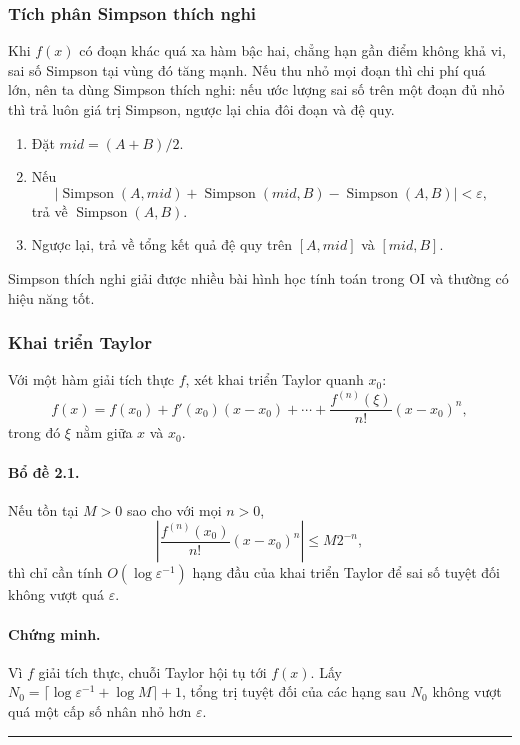 \documentclass[11pt]{article}
\begin{document}
\subsubsection{Tích phân Simpson thích nghi}

Khi $f(x)$ có đoạn khác quá xa hàm bậc hai, chẳng hạn gần điểm không khả vi,
sai số Simpson tại vùng đó tăng mạnh. Nếu thu nhỏ mọi đoạn thì chi phí quá lớn,
nên ta dùng Simpson thích nghi: nếu ước lượng sai số trên một đoạn đủ nhỏ thì
trả luôn giá trị Simpson, ngược lại chia đôi đoạn và đệ quy.

\begin{enumerate}
  \item Đặt $\mathit{mid}=(A+B)/2$.
  \item Nếu
  \[
    |\operatorname{Simpson}(A,\mathit{mid})
    +\operatorname{Simpson}(\mathit{mid},B)
    -\operatorname{Simpson}(A,B)|<\varepsilon,
  \]
  trả về $\operatorname{Simpson}(A,B)$.
  \item Ngược lại, trả về tổng kết quả đệ quy trên
  $[A,\mathit{mid}]$ và $[\mathit{mid},B]$.
\end{enumerate}

Simpson thích nghi giải được nhiều bài hình học tính toán trong OI và thường có
hiệu năng tốt.

\subsubsection{Khai triển Taylor}

Với một hàm giải tích thực $f$, xét khai triển Taylor quanh $x_0$:
\[
  f(x)=f(x_0)+f'(x_0)(x-x_0)+\cdots+
  \frac{f^{(n)}(\xi)}{n!}(x-x_0)^n,
\]
trong đó $\xi$ nằm giữa $x$ và $x_0$.

\paragraph{Bổ đề 2.1.}
Nếu tồn tại $M>0$ sao cho với mọi $n>0$,
\[
  \left|\frac{f^{(n)}(x_0)}{n!}(x-x_0)^n\right|\le M2^{-n},
\]
thì chỉ cần tính $O(\log\varepsilon^{-1})$ hạng đầu của khai triển Taylor để
sai số tuyệt đối không vượt quá $\varepsilon$.

\paragraph{Chứng minh.}
Vì $f$ giải tích thực, chuỗi Taylor hội tụ tới $f(x)$. Lấy
$N_0=\lceil\log\varepsilon^{-1}+\log M\rceil+1$, tổng trị tuyệt đối của các
hạng sau $N_0$ không vượt quá một cấp số nhân nhỏ hơn $\varepsilon$.
\hfill\rule{0.55em}{0.55em}
\end{document}
